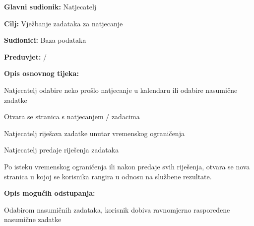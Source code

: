 			\noindent {}
			\begin{packed_item}
				
				\item \textbf{Glavni sudionik: } Natjecatelj
				\item  \textbf{Cilj:} Vježbanje zadataka za natjecanje
				\item  \textbf{Sudionici:} Baza podataka
				\item  \textbf{Preduvjet:}  / 
				\item  \textbf{Opis osnovnog tijeka:}
				
				\item[] \begin{packed_enum}
					\item Natjecatelj odabire neko prošlo natjecanje u kalendaru ili odabire nasumične zadatke
					\item Otvara se stranica s natjecanjem / zadacima
					\item Natjecatelj riješava zadatke unutar vremenskog ograničenja
					\item Natjecatelj predaje riješenja zadataka
					\item Po isteku vremenskog ograničenja ili nakon predaje svih riješenja, otvara se nova stranica u kojoj se korisnika rangira u odnosu na službene rezultate.
				\end{packed_enum}
				\item  \textbf{Opis mogućih odstupanja:  } 
				\item[] \begin{packed_enum}
				
					\item[1.a]Odabirom nasumičnih zadataka, korisnik dobiva ravnomjerno raspoređene nasumične zadatke
				
				\end{packed_enum}
				\end{packed_item}
				
